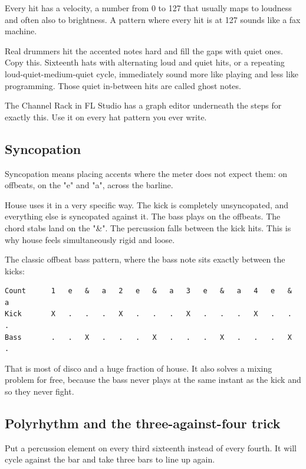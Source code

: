 Every hit has a velocity, a number from 0 to 127 that usually maps to loudness and often
also to brightness. A pattern where every hit is at 127 sounds like a fax machine.

Real drummers hit the accented notes hard and fill the gaps with quiet ones. Copy this.
Sixteenth hats with alternating loud and quiet hits, or a repeating loud-quiet-medium-quiet
cycle, immediately sound more like playing and less like programming. Those quiet in-between
hits are called ghost notes.

The Channel Rack in FL Studio has a graph editor underneath the steps for exactly this. Use
it on every hat pattern you ever write.

\subsection{Syncopation}\label{th03_rhythm-syncopation}

Syncopation means placing accents where the meter does not expect them: on offbeats, on the
"e" and "a", across the barline.

House uses it in a very specific way. The kick is completely unsyncopated, and everything
else is syncopated against it. The bass plays on the offbeats. The chord stabs land on the
"\&". The percussion falls between the kick hits. This is why house feels simultaneously
rigid and loose.

The classic offbeat bass pattern, where the bass note sits exactly between the kicks:

\begin{verbatim}
Count      1   e   &   a   2   e   &   a   3   e   &   a   4   e   &   a
Kick       X   .   .   .   X   .   .   .   X   .   .   .   X   .   .   .
Bass       .   .   X   .   .   .   X   .   .   .   X   .   .   .   X   .
\end{verbatim}

That is most of disco and a huge fraction of house. It also solves a mixing problem for
free, because the bass never plays at the same instant as the kick and so they never fight.

\subsection{Polyrhythm and the three-against-four trick}\label{th03_rhythm-polyrhythm-and-the-three-against-four-trick}

Put a percussion element on every third sixteenth instead of every fourth. It will cycle
against the bar and take three bars to line up again.

